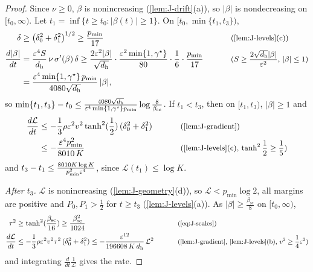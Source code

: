\begin{proof}
Since $\nu\ge0$, $\beta$ is nonincreasing (\cref{lem:J-drift}(a)), so $|\beta|$ is nondecreasing on $[t_0,\infty)$. Let $t_1=\inf\{t\ge t_0:|\beta(t)|\ge1\}$. On
$[t_0,\min\{t_1,t_3\})$,
\begin{alignat*}{2}
 \delta&\ge\bigl(\delta_0^2+\delta_1^2\bigr)^{1/2}\ge\frac{p_{\min}}{17} &\qquad& \why{\cref{lem:J-levels}(c)}\\
 \frac{d|\beta|}{dt}&=\frac{\initscale^4S}{d_{\mathrm h}}\,\nu\,\sigma'(\beta)\,\delta\ge\frac{2\initscale^2|\beta|}{\sqrt{d_{\mathrm h}}}\cdot\frac{\initscale^2\min\{1,\gamma^\star\}}{80}\cdot\frac{1}{6}\cdot\frac{p_{\min}}{17} && \why{$S\ge\frac{2\sqrt{d_{\mathrm h}}|\beta|}{\initscale^2}$, $|\beta|\le1$}\\
 &=\frac{\initscale^4\min\{1,\gamma^\star\}\,p_{\min}}{4080\sqrt{d_{\mathrm h}}}\,|\beta|,
\end{alignat*}
so $\min\{t_1,t_3\}-t_0\le\frac{4080\sqrt{d_{\mathrm h}}}{\varepsilon^4\min\{1,\gamma^\star\}p_{\min}}\log\frac{8}{\beta_{\mathrm{sc}}}$. If $t_1<t_3$, then on $[t_1,t_3)$, $|\beta|\ge1$ and
\begin{alignat*}{2}
 \ddt{\mathcal L}&\le-\tfrac{1}{3}\rho\initscale^2v^2\tanh^2(\tfrac{1}{2})\,(\delta_0^2+\delta_1^2) &\qquad& \why{\cref{lem:J-gradient}}\\
 &\le-\frac{\initscale^4p_{\min}^2}{8010\,K} && \why{\cref{lem:J-levels}(c), $\tanh^2\tfrac{1}{2}\ge\tfrac{1}{5}$}
\end{alignat*}
and $t_3-t_1\le\frac{8010K\log K}{p_{\min}^2\varepsilon^4}$, since $\mathcal L(t_1)\le\log K$.

\emph{After $t_3$.} $\mathcal L$ is nonincreasing (\cref{lem:J-geometry}(d)), so $\mathcal L<p_{\min}\log2$, all margins are positive and $P_0,P_1>\frac{1}{2}$
for $t\ge t_3$ (\cref{lem:J-levels}(a)). As $|\beta|\ge\frac{\beta_{\mathrm{sc}}}{8}$ on $[t_0,\infty)$,
\begin{alignat*}{2}
 \tau^2&\ge\tanh^2(\tfrac{\beta_{\mathrm{sc}}}{16})\ge\frac{\beta_{\mathrm{sc}}^2}{1024} &\qquad& \why{\cref{eq:J-scales}}\\
 \ddt{\mathcal L}&\le-\tfrac{1}{3}\rho\initscale^2v^2\tau^2\,(\delta_0^2+\delta_1^2)\le-\frac{\initscale^{12}}{196608\,K\,d_{\mathrm h}}\,\mathcal L^2 && \why{\cref{lem:J-gradient}, \cref{lem:J-levels}(b), $v^2\ge\tfrac{1}{4}\initscale^2$}
\end{alignat*}
and integrating $\frac{d}{dt}\frac{1}{\mathcal L}$ gives the rate.
\end{proof}

